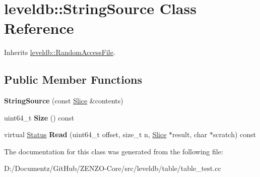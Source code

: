 \hypertarget{classleveldb_1_1_string_source}{}\section{leveldb\+::String\+Source Class Reference}
\label{classleveldb_1_1_string_source}


Inherits \mbox{\hyperlink{classleveldb_1_1_random_access_file}{leveldb\+::\+Random\+Access\+File}}.

\subsection*{Public Member Functions}
\begin{DoxyCompactItemize}
\item 
\mbox{\label{classleveldb_1_1_string_source_a4f85ccda6f37775d790834de05284fda}} 
{\bfseries String\+Source} (const \mbox{\hyperlink{classleveldb_1_1_slice}{Slice}} \&contents)
\item 
\mbox{\label{classleveldb_1_1_string_source_ab301b92b1f4241716f6f4de39ec37c7d}} 
uint64\+\_\+t {\bfseries Size} () const
\item 
\mbox{\label{classleveldb_1_1_string_source_a1559264c0313ee764943b8995d26ddb8}} 
virtual \mbox{\hyperlink{classleveldb_1_1_status}{Status}} {\bfseries Read} (uint64\+\_\+t offset, size\+\_\+t n, \mbox{\hyperlink{classleveldb_1_1_slice}{Slice}} $\ast$result, char $\ast$scratch) const
\end{DoxyCompactItemize}


The documentation for this class was generated from the following file\+:\begin{DoxyCompactItemize}
\item 
D\+:/\+Documentz/\+Git\+Hub/\+Z\+E\+N\+Z\+O-\/\+Core/src/leveldb/table/table\+\_\+test.\+cc\end{DoxyCompactItemize}
